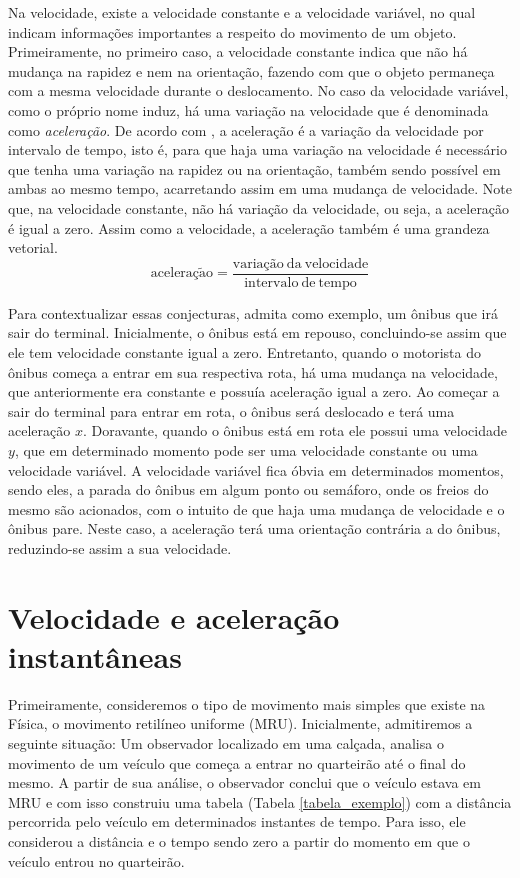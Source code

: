 \documentclass[
	12pt,				%
	openright,			%
    twoside,			%
	a4paper,			%
	chapter=TITLE,		%
	english,			%
	french,				%
	spanish,			%
	brazil				%
	]{abntex2}
\numberwithin{lema}{chapter}
\numberwithin{teorema}{chapter}
\numberwithin{definicao}{chapter}
\numberwithin{exemplo}{chapter}
\numberwithin{figure}{chapter}
\begin{document}
Na velocidade, existe a velocidade constante e a velocidade variável, no qual indicam informações importantes a respeito do movimento de um objeto. Primeiramente, no primeiro caso, a velocidade constante indica que não há mudança na rapidez e nem na orientação, fazendo com que o objeto permaneça com a mesma velocidade durante o deslocamento. No caso da velocidade variável, como o próprio nome induz, há uma variação na velocidade que é denominada como \textit{aceleração}. De acordo com , a aceleração é a variação da velocidade por intervalo de tempo, isto é, para que haja uma variação na velocidade é necessário que tenha uma variação na rapidez ou na orientação, também sendo possível em ambas ao mesmo tempo, acarretando assim em uma mudança de velocidade. Note que, na velocidade constante, não há variação da velocidade, ou seja, a aceleração é igual a zero. Assim como a velocidade, a aceleração também é uma grandeza vetorial.
$$\mathrm{acelera \text{ç} \tilde{a}o = \dfrac{varia \text{çã}o \ da \ velocidade}{intervalo \ de \ tempo}}$$

Para contextualizar essas conjecturas, admita como exemplo, um ônibus que irá sair do terminal. Inicialmente, o ônibus está em repouso, concluindo-se assim que ele tem velocidade constante igual a zero. Entretanto, quando o motorista do ônibus começa a entrar em sua respectiva rota, há uma mudança na velocidade, que anteriormente era constante e possuía aceleração igual a zero. Ao começar a sair do terminal para entrar em rota, o ônibus será deslocado e terá uma aceleração $x$. Doravante, quando o ônibus está em rota ele possui uma velocidade $y$, que em determinado momento pode ser uma velocidade constante ou uma velocidade variável. A velocidade variável fica óbvia em determinados momentos, sendo eles, a parada do ônibus em algum ponto ou semáforo, onde os freios do mesmo são acionados, com o intuito de que haja uma mudança de velocidade e o ônibus pare. Neste caso, a aceleração terá uma orientação contrária a do ônibus, reduzindo-se assim a sua velocidade.

\section{Velocidade e aceleração instantâneas}
\label{secao_3.2}

Primeiramente, consideremos o tipo de movimento mais simples que existe na Física, o movimento retilíneo uniforme (MRU). Inicialmente, admitiremos a seguinte situação: Um observador localizado em uma calçada, analisa o movimento de um veículo que começa a entrar no quarteirão até o final do mesmo. A partir de sua análise, o observador conclui que o veículo estava em MRU e com isso construiu uma tabela (Tabela \ref{tabela_exemplo}) com a distância percorrida pelo veículo em determinados instantes de tempo. Para isso, ele considerou a distância e o tempo sendo zero a partir do momento em que o veículo entrou no quarteirão.
\end{document}
